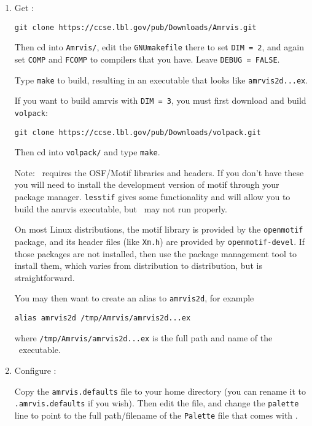 \begin{enumerate}

\item Get \amrvis:

\begin{verbatim}
git clone https://ccse.lbl.gov/pub/Downloads/Amrvis.git
\end{verbatim}

Then cd into {\tt Amrvis/}, edit the {\tt GNUmakefile} there
to set {\tt DIM = 2}, and again set {\tt COMP} and {\tt FCOMP} to compilers that
you have. Leave {\tt DEBUG = FALSE}.

Type {\tt make} to build, resulting in an executable that
looks like {\tt amrvis2d...ex}.

If you want to build amrvis with {\tt DIM = 3}, you must first
download and build {\tt volpack}:
\begin{verbatim}
git clone https://ccse.lbl.gov/pub/Downloads/volpack.git
\end{verbatim}

Then cd into {\tt volpack/} and type {\tt make}.

Note: \amrvis\ requires the OSF/Motif libraries and headers. If you don't have these
you will need to install the development version of motif through your package manager.
{\tt lesstif} gives some functionality and will allow you to build the amrvis executable,
but \amrvis\ may not run properly.

On most Linux distributions, the motif library is provided by the
{\tt openmotif} package, and its header files (like {\tt Xm.h}) are provided
by {\tt openmotif-devel}. If those packages are not installed, then use the
package management tool to install them, which varies from
distribution to distribution, but is straightforward.

You may then want to create an alias to {\tt amrvis2d}, for example
\begin{verbatim}
alias amrvis2d /tmp/Amrvis/amrvis2d...ex
\end{verbatim}
where {\tt /tmp/Amrvis/amrvis2d...ex} is the full path and name of the \amrvis\ executable.

\item Configure \amrvis:

  Copy the {\tt amrvis.defaults} file to your home directory (you can
  rename it to {\tt .amrvis.defaults} if you wish).  Then edit the
  file, and change the {\tt palette} line to point to the full
  path/filename of the {\tt Palette} file that comes with \amrvis.


\end{enumerate}
